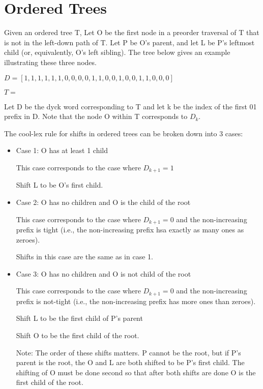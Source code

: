\documentclass{article}
\begin{document}
\section*{Ordered Trees}


Given an ordered tree T, Let O be the first node in a preorder traversal of T that is not in the left-down path of T. Let P be O's parent, and let L be P's leftmost child (or, equivalently, O's left sibling).  The tree below gives an example illustrating these three nodes. 

$D=[1, 1, 1, 1, 1, 1, 0, 0, 0, 0, 1, 1, 0, 0, 1, 0, 0, 1, 1, 0, 0, 0]$

$T=$


\noindent Let D be the dyck word corresponding to T and let k be the index of the first 01 prefix in D. Note that the node O within T corresponds to $D_k$.

\noindent The cool-lex rule for shifts in ordered trees can be broken down into 3 cases:
\begin{itemize}
    \item Case 1: O has at least 1 child
	
	This case corresponds to the case where $D_{k+1}=1$
	
	Shift L to be O's first child. 


    \item Case 2: O has no children and O is the child of the root

	This case corresponds to the case where $D_{k+1}=0$ and the non-increasing prefix is tight (i.e., the non-increasing prefix hsa exactly as many ones as zeroes).
	
	Shifts in this case are the same as in case 1. 
    \item Case 3: O has no children and O is not child of the root

	This case corresponds to the case where $D_{k+1}=0$ and the non-increasing prefix is not-tight (i.e., the non-increasing prefix has more ones than zeroes). 

	Shift L to be the first child of P's parent

	Shift O to be the first child of the root. 

	Note: The order of these shifts matters. P cannot be the root, but if P's parent is the root, the O and L are both shifted to be P's first child. The shifting of O must be done second so that after both shifts are done O is the first child of the root. 


\end{itemize}
\end{document}

